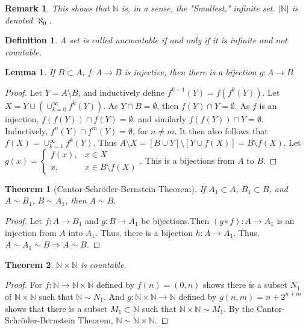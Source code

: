\documentclass[oneside]{book}
\theoremstyle{mystyle}
\newtheorem{theorem}{Theorem}[section]
\newtheorem{definition}{Definition}[section]
\newtheorem{lemma}{Lemma}[section]
\newtheorem{remark}{Remark}[section]
\begin{document}
\begin{remark}
This shows that $\mathbb{N}$ is, in a sense, the "Smallest," infinite set. $|\mathbb{N}|$ is denoted $\aleph_0$.
\end{remark}

\begin{definition}
A set is called uncountable if and only if it is infinite and not countable.
\end{definition}

\begin{lemma}
If $B\subset A$, $f:A\rightarrow B$ is injective, then there is a bijection $g:A\rightarrow B$
\end{lemma}
\begin{proof}
Let $Y = A\setminus B$, and inductively define $f^{k+1}(Y) = f(f^{k}(Y))$. Let $X = Y\cup (\cup_{k=0}^{\infty} f^{k}(Y))$. As $Y\cap B = \emptyset$, then $f(Y)\cap Y= \emptyset$. As $f$ is an injection, $f(f(Y))\cap f(Y)=\emptyset$, and similarly $f(f(Y))\cap Y = \emptyset$. Inductively, $f^{n}(Y)\cap f^{m}(Y) = \emptyset$, for $n\ne m$. It then also follows that $f(X) = \cup_{k=1}^{\infty} f^{k}(Y)$. Thus $A\setminus X = [B\cup Y]\setminus [Y\cup f(X)] = B\setminus f(X)$. Let $g(x) = \begin{cases} f(x), & x\in X \\ x, & x \in B\setminus f(X)\end{cases}$. This is a bijections from $A$ to $B$.
\end{proof}

\begin{theorem}[Cantor-Schr\"{o}der-Bernstein Theorem]
If $A_1 \subset A$, $B_1 \subset B$, and $A\sim B_1$, $B \sim A_1$, then $A\sim B$.
\end{theorem}
\begin{proof}
Let $f:A\rightarrow B_1$ and $g:B\rightarrow A_1$ be bijections.Then $(g\circ f):A\rightarrow A_1$ is an injection from $A$ into $A_1$. Thus, there is a bijection $h:A\rightarrow A_1$. Thus, $A\sim A_1 \sim B\Rightarrow A\sim B$.
\end{proof}

\begin{theorem}
$\mathbb{N}\times \mathbb{N}$ is countable.
\end{theorem}
\begin{proof}
For $f:\mathbb{N} \rightarrow \mathbb{N}\times \mathbb{N}$ defined by $f(n) = (0,n)$ shows there is a subset $N_1$ of $\mathbb{N} \times \mathbb{N}$ such that $\mathbb{N}\sim N_1$. And $g:\mathbb{N}\times \mathbb{N} \rightarrow \mathbb{N}$ defined by $g(n,m) =n+2^{n+m}$ shows that there is a subset $M_1 \subset \mathbb{N}$ such that $\mathbb{N} \times \mathbb{N} \sim M_1$. By the Cantor-Schr\"{o}der-Bernstein Theorem, $\mathbb{N} \sim \mathbb{N}\times \mathbb{N}$.
\end{proof}
\end{document}
